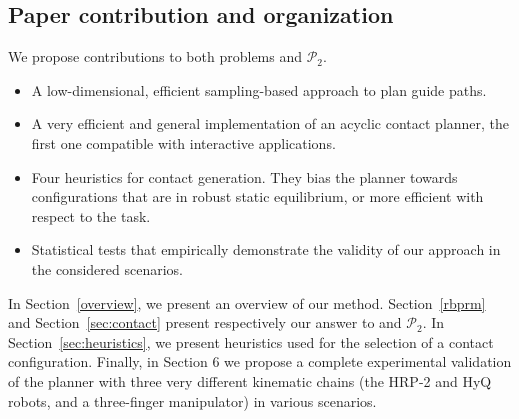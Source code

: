 \subsection{Paper contribution and organization}
We propose contributions to both problems \Pa and $\mathcal{P}_2$.
\begin{itemize}
\item A low-dimensional, efficient sampling-based approach to plan guide paths.
\item A very efficient and general implementation of an acyclic contact planner, the first one compatible with \gls{interactive} applications.
\item Four heuristics for contact generation. They bias the planner towards configurations that are in robust static equilibrium, or 
more efficient with respect to the task.
\item Statistical tests that empirically demonstrate the validity of our approach in the considered scenarios. 
\end{itemize}



In Section~\ref{overview}, we present an overview of our method. Section~\ref{rbprm} and Section~\ref{sec:contact} present respectively our answer to \Pa and $\mathcal{P}_2$. In Section~\ref{sec:heuristics}, we present heuristics used for the selection of a contact configuration. Finally, in Section 6 we propose a complete experimental validation of the planner with three very different kinematic chains (the HRP-2 and HyQ robots, and a three-finger manipulator) in various scenarios.

